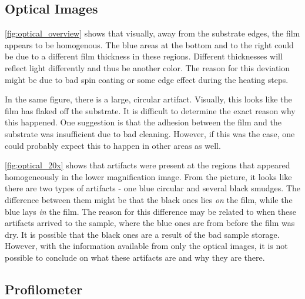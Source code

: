 
\subsection{Optical Images}

\noindent \autoref{fig:optical_overview} shows that visually, away from the substrate edges, the film appears to be homogenous.
The blue areas at the bottom and to the right could be due to a different film thickness in these regions.
Different thicknesses will reflect light differently and thus be another color.
The reason for this deviation might be due to bad spin coating or some edge effect during the heating steps.

In the same figure, there is a large, circular artifact.
Visually, this looks like the film has flaked off the substrate.
It is difficult to determine the exact reason why this happened.
One suggestion is that the adhesion between the film and the substrate was insufficient due to bad cleaning.
However, if this was the case, one could probably expect this to happen in other areas as well.

\autoref{fig:optical_20x} shows that artifacts were present at the regions that appeared homogeneously in the lower magnification image.
From the picture, it looks like there are two types of artifacts -  one blue circular and several black smudges.
The difference between them might be that the black ones lies \textit{on} the film, while the blue lays \textit{in} the film.
The reason for this difference may be related to when these artifacts arrived to the sample, where the blue ones are from before the film was dry.
It is possible that the black ones are a result of the bad sample storage.
However, with the information available from only the optical images, it is not possible to conclude on what these artifacts are and why they are there.

\subsection{Profilometer}

